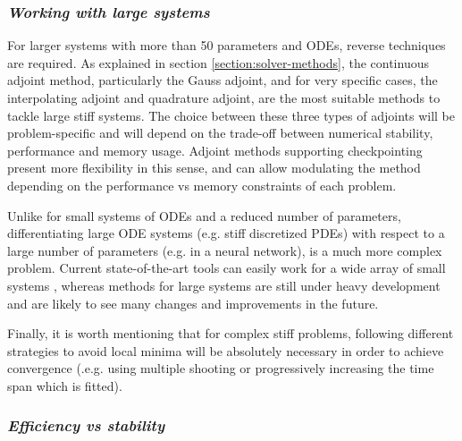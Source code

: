 \subsubsection*{\textit{Working with large systems}}

For larger systems with more than 50 parameters and ODEs, reverse techniques are required. 
As explained in section \ref{section:solver-methods}, the continuous adjoint method, particularly the Gauss adjoint, and for very specific cases, the interpolating adjoint and quadrature adjoint, are the most suitable methods to tackle large stiff systems. 
The choice between these three types of adjoints will be problem-specific and will depend on the trade-off between numerical stability, performance and memory usage. 
Adjoint methods supporting checkpointing present more flexibility in this sense, and can allow modulating the method depending on the performance vs memory constraints of each problem. 

Unlike for small systems of ODEs and a reduced number of parameters, differentiating large ODE systems (e.g. stiff discretized PDEs) with respect to a large number of parameters (e.g. in a neural network), is a much more complex problem. 
Current state-of-the-art tools can easily work for a wide array of small systems \cite{rackauckas2020universal}, whereas methods for large systems are still under heavy development and are likely to see many changes and improvements in the future.

Finally, it is worth mentioning that for complex stiff problems, following different strategies to avoid local minima will be absolutely necessary in order to achieve convergence (.e.g. using multiple shooting \cite{Kiehl:2006tb, Boussange2024} or progressively increasing the time span which is fitted).

\subsubsection*{\textit{Efficiency vs stability}}

